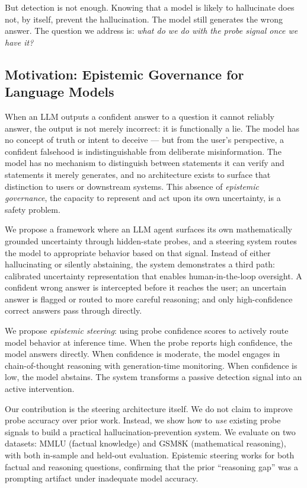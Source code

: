 \documentclass{article}
\begin{document}
But detection is not enough. Knowing that a model is likely to hallucinate does not, by itself, prevent the hallucination. The model still generates the wrong answer. The question we address is: \emph{what do we do with the probe signal once we have it?}

\subsection{Motivation: Epistemic Governance for Language Models}

When an LLM outputs a confident answer to a question it cannot reliably answer, the output is not merely incorrect: it is functionally a lie. The model has no concept of truth or intent to deceive — but from the user's perspective, a confident falsehood is indistinguishable from deliberate misinformation. The model has no mechanism to distinguish between statements it can verify and statements it merely generates, and no architecture exists to surface that distinction to users or downstream systems. This absence of \emph{epistemic governance}, the capacity to represent and act upon its own uncertainty, is a safety problem.

We propose a framework where an LLM agent surfaces its own mathematically grounded uncertainty through hidden-state probes, and a steering system routes the model to appropriate behavior based on that signal. Instead of either hallucinating or silently abstaining, the system demonstrates a third path: calibrated uncertainty representation that enables human-in-the-loop oversight. A confident wrong answer is intercepted before it reaches the user; an uncertain answer is flagged or routed to more careful reasoning; and only high-confidence correct answers pass through directly.

We propose \emph{epistemic steering}: using probe confidence scores to actively route model behavior at inference time. When the probe reports high confidence, the model answers directly. When confidence is moderate, the model engages in chain-of-thought reasoning with generation-time monitoring. When confidence is low, the model abstains. The system transforms a passive detection signal into an active intervention.

Our contribution is the steering architecture itself. We do not claim to improve probe accuracy over prior work. Instead, we show how to \emph{use} existing probe signals to build a practical hallucination-prevention system. We evaluate on two datasets: MMLU (factual knowledge) and GSM8K (mathematical reasoning), with both in-sample and held-out evaluation. Epistemic steering works for both factual and reasoning questions, confirming that the prior ``reasoning gap'' was a prompting artifact under inadequate model accuracy.
\end{document}

